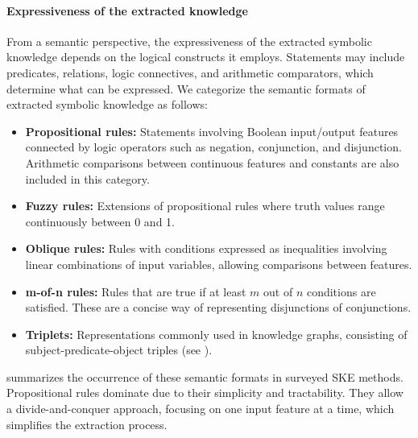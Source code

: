 \paragraph{Expressiveness of the extracted knowledge}
%
From a semantic perspective, the expressiveness of the extracted symbolic knowledge depends on the logical constructs it employs.
%
Statements may include predicates, relations, logic connectives, and arithmetic comparators, which determine what can be expressed.
%
We categorize the semantic formats of extracted symbolic knowledge as follows:
%
\begin{itemize}
    \item \textbf{Propositional rules:} Statements involving Boolean input/output features connected by logic operators such as negation, conjunction, and disjunction.
    Arithmetic comparisons between continuous features and constants are also included in this category.
    \item \textbf{Fuzzy rules:} Extensions of propositional rules where truth values range continuously between 0 and 1.
    \item \textbf{Oblique rules:} Rules with conditions expressed as inequalities involving linear combinations of input variables, allowing comparisons between features.
    \item \textbf{m-of-n rules:} Rules that are true if at least \(m\) out of \(n\) conditions are satisfied.
    These are a concise way of representing disjunctions of conjunctions.
    \item \textbf{Triplets:} Representations commonly used in knowledge graphs, consisting of subject-predicate-object triples (see ).
\end{itemize}

 summarizes the occurrence of these semantic formats in surveyed \gls{SKE} methods.
%
Propositional rules dominate due to their simplicity and tractability.
%
They allow a divide-and-conquer approach, focusing on one input feature at a time, which simplifies the extraction process.


